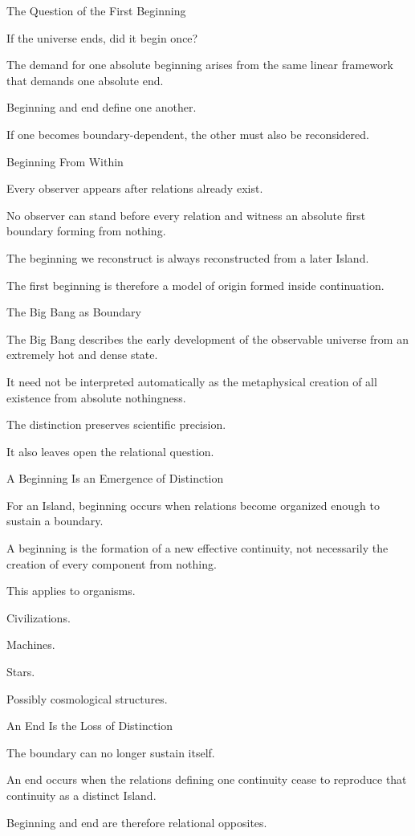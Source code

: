 The Question of the First Beginning

If the universe ends, did it begin once?

The demand for one absolute beginning arises from the same linear framework that demands one absolute end.

Beginning and end define one another.

If one becomes boundary-dependent, the other must also be reconsidered.

Beginning From Within

Every observer appears after relations already exist.

No observer can stand before every relation and witness an absolute first boundary forming from nothing.

The beginning we reconstruct is always reconstructed from a later Island.

The first beginning is therefore a model of origin formed inside continuation.

The Big Bang as Boundary

The Big Bang describes the early development of the observable universe from an extremely hot and dense state.

It need not be interpreted automatically as the metaphysical creation of all existence from absolute nothingness.

The distinction preserves scientific precision.

It also leaves open the relational question.

A Beginning Is an Emergence of Distinction

For an Island, beginning occurs when relations become organized enough to sustain a boundary.

A beginning is the formation of a new effective continuity, not necessarily the creation of every component from nothing.

This applies to organisms.

Civilizations.

Machines.

Stars.

Possibly cosmological structures.

An End Is the Loss of Distinction

The boundary can no longer sustain itself.

An end occurs when the relations defining one continuity cease to reproduce that continuity as a distinct Island.

Beginning and end are therefore relational opposites.


